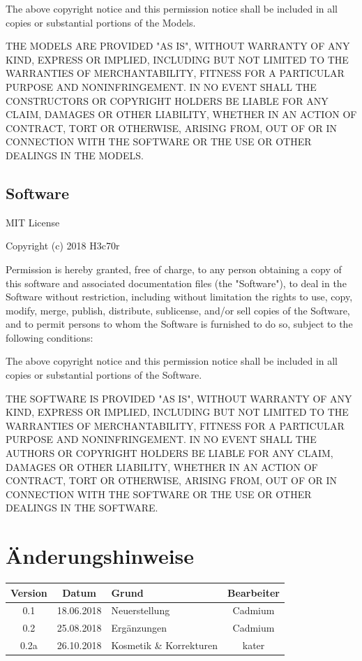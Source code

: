 \documentclass[a4paper]{scrartcl}
\begin{document}
\noindent
The above copyright notice and this permission notice shall be included in all
copies or substantial portions of the Models.

\noindent
THE MODELS ARE PROVIDED "{}AS IS"{}, WITHOUT WARRANTY OF ANY KIND, EXPRESS OR
IMPLIED, INCLUDING BUT NOT LIMITED TO THE WARRANTIES OF MERCHANTABILITY,
FITNESS FOR A PARTICULAR PURPOSE AND NONINFRINGEMENT. IN NO EVENT SHALL THE
CONSTRUCTORS OR COPYRIGHT HOLDERS BE LIABLE FOR ANY CLAIM, DAMAGES OR OTHER
LIABILITY, WHETHER IN AN ACTION OF CONTRACT, TORT OR OTHERWISE, ARISING FROM,
OUT OF OR IN CONNECTION WITH THE SOFTWARE OR THE USE OR OTHER DEALINGS IN THE
MODELS.

\subsection{Software}
MIT License

\noindent
Copyright (c) 2018 H3c70r

\noindent
Permission is hereby granted, free of charge, to any person obtaining a copy
of this software and associated documentation files (the "{}Software"{}), to deal
in the Software without restriction, including without limitation the rights
to use, copy, modify, merge, publish, distribute, sublicense, and/or sell
copies of the Software, and to permit persons to whom the Software is
furnished to do so, subject to the following conditions:

\noindent
The above copyright notice and this permission notice shall be included in all
copies or substantial portions of the Software.

\noindent
THE SOFTWARE IS PROVIDED "{}AS IS"{}, WITHOUT WARRANTY OF ANY KIND, EXPRESS OR
IMPLIED, INCLUDING BUT NOT LIMITED TO THE WARRANTIES OF MERCHANTABILITY,
FITNESS FOR A PARTICULAR PURPOSE AND NONINFRINGEMENT. IN NO EVENT SHALL THE
AUTHORS OR COPYRIGHT HOLDERS BE LIABLE FOR ANY CLAIM, DAMAGES OR OTHER
LIABILITY, WHETHER IN AN ACTION OF CONTRACT, TORT OR OTHERWISE, ARISING FROM,
OUT OF OR IN CONNECTION WITH THE SOFTWARE OR THE USE OR OTHER DEALINGS IN THE
SOFTWARE.



\section{Änderungshinweise}

\begin{tabular}{|c|c|l|c|}
\hline
Version & Datum & Grund & Bearbeiter \\
\hline 
0.1 & 18.06.2018 & Neuerstellung & Cadmium \\
\hline
0.2 & 25.08.2018 & Ergänzungen & Cadmium \\
\hline
0.2a & 26.10.2018 & Kosmetik \& Korrekturen & kater \\
\hline
\end{tabular}

\newpage
\end{document}

